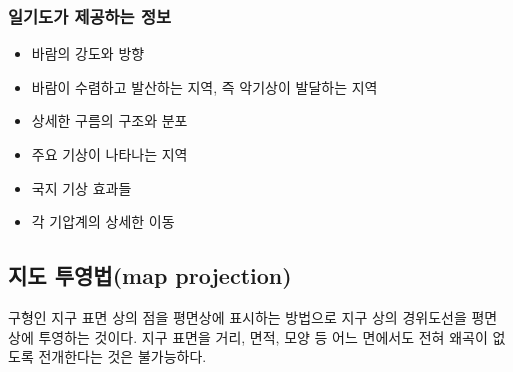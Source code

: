 \subsubsection{일기도가 제공하는 정보}
\begin{itemize}
	\item 바람의 강도와 방향
	\item 바람이 수렴하고 발산하는 지역, 즉 악기상이 발달하는 지역
	\item 상세한 구름의 구조와 분포
	\item 주요 기상이 나타나는 지역
	\item 국지 기상 효과들
	\item 각 기압계의 상세한 이동
\end{itemize}


\subsection{지도 투영법(map projection)}

구형인 지구 표면 상의 점을 평면상에 표시하는 방법으로 지구 상의 경위도선을 평면 상에 투영하는 것이다. 지구 표면을 거리, 면적, 모양 등 어느 면에서도 전혀 왜곡이 없도록 전개한다는 것은 불가능하다.




